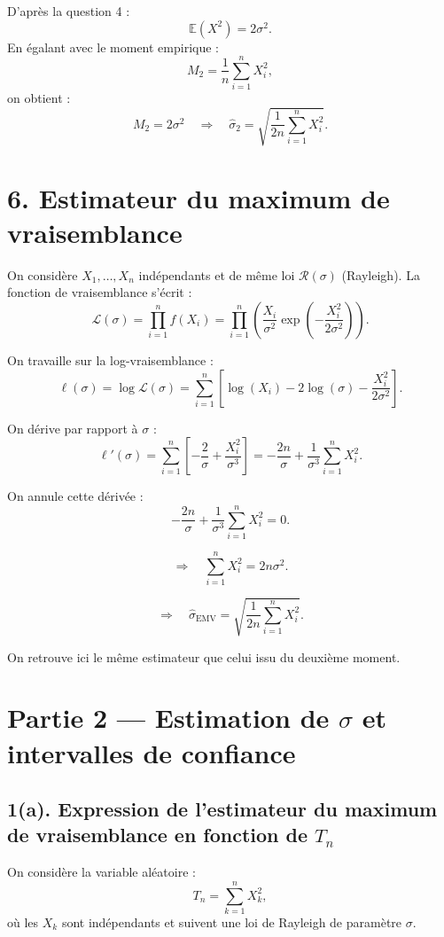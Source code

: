 \documentclass[a4paper,11pt]{article}
\begin{document}
D'après la question 4 :
\[
\mathbb{E}(X^2) = 2\sigma^2.
\]
En égalant avec le moment empirique :
\[
M_2 = \frac{1}{n} \sum_{i=1}^n X_i^2,
\]
on obtient :
\[
M_2 = 2\sigma^2 \quad \Rightarrow \quad \hat{\sigma}_2 = \sqrt{\frac{1}{2n} \sum_{i=1}^n X_i^2}.
\]

\vspace{1em}
\section*{6. Estimateur du maximum de vraisemblance}

On considère $X_1, \dots, X_n$ indépendants et de même loi $\mathcal{R}(\sigma)$ (Rayleigh). La fonction de vraisemblance s’écrit :
\[
\mathcal{L}(\sigma) = \prod_{i=1}^n f(X_i) = \prod_{i=1}^n \left( \frac{X_i}{\sigma^2} \exp\left( -\frac{X_i^2}{2\sigma^2} \right) \right).
\]

On travaille sur la log-vraisemblance :
\[
\ell(\sigma) = \log \mathcal{L}(\sigma) = \sum_{i=1}^n \left[ \log(X_i) - 2\log(\sigma) - \frac{X_i^2}{2\sigma^2} \right].
\]

On dérive par rapport à $\sigma$ :
\[
\ell'(\sigma) = \sum_{i=1}^n \left[ -\frac{2}{\sigma} + \frac{X_i^2}{\sigma^3} \right] = -\frac{2n}{\sigma} + \frac{1}{\sigma^3} \sum_{i=1}^n X_i^2.
\]

On annule cette dérivée :
\[
-\frac{2n}{\sigma} + \frac{1}{\sigma^3} \sum_{i=1}^n X_i^2 = 0.
\]

\[
\Rightarrow \quad \sum_{i=1}^n X_i^2 = 2n\sigma^2.
\]

\[
\Rightarrow \quad \hat{\sigma}_{\text{EMV}} = \sqrt{\frac{1}{2n} \sum_{i=1}^n X_i^2}.
\]

On retrouve ici le même estimateur que celui issu du deuxième moment.


\newpage
\section*{Partie 2 — Estimation de $\sigma$ et intervalles de confiance}

\vspace{1em}
\subsection*{1(a). Expression de l'estimateur du maximum de vraisemblance en fonction de $T_n$}

On considère la variable aléatoire :
\[
T_n = \sum_{k=1}^n X_k^2,
\]
où les $X_k$ sont indépendants et suivent une loi de Rayleigh de paramètre $\sigma$.
\end{document}
